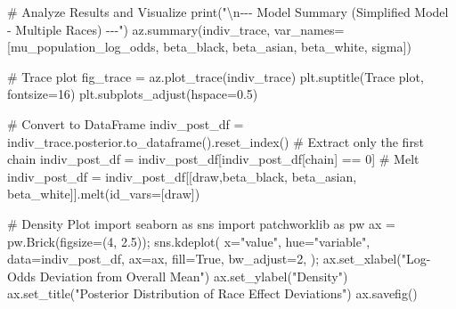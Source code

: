 \documentclass[
]{agujournal2019}
\newenvironment{Shaded}{\begin{snugshade}}{\end{snugshade}}
\newcommand{\BuiltInTok}[1]{\textcolor[rgb]{0.00,0.23,0.31}{#1}}
\newcommand{\CharTok}[1]{\textcolor[rgb]{0.13,0.47,0.30}{#1}}
\newcommand{\CommentTok}[1]{\textcolor[rgb]{0.37,0.37,0.37}{#1}}
\newcommand{\DecValTok}[1]{\textcolor[rgb]{0.68,0.00,0.00}{#1}}
\newcommand{\FloatTok}[1]{\textcolor[rgb]{0.68,0.00,0.00}{#1}}
\newcommand{\ImportTok}[1]{\textcolor[rgb]{0.00,0.46,0.62}{#1}}
\newcommand{\NormalTok}[1]{\textcolor[rgb]{0.00,0.23,0.31}{#1}}
\newcommand{\OperatorTok}[1]{\textcolor[rgb]{0.37,0.37,0.37}{#1}}
\newcommand{\StringTok}[1]{\textcolor[rgb]{0.13,0.47,0.30}{#1}}
\newcommand{\VariableTok}[1]{\textcolor[rgb]{0.07,0.07,0.07}{#1}}
\begin{document}
\begin{Shaded}
\begin{Highlighting}[]
\CommentTok{\# Analyze Results and Visualize}
\BuiltInTok{print}\NormalTok{(}\StringTok{"}\CharTok{\textbackslash{}n}\StringTok{{-}{-}{-} Model Summary (Simplified Model {-} Multiple Races) {-}{-}{-}"}\NormalTok{)}
\NormalTok{az.summary(indiv\_trace, var\_names}\OperatorTok{=}\NormalTok{[}\StringTok{\textquotesingle{}mu\_population\_log\_odds\textquotesingle{}}\NormalTok{, }\StringTok{\textquotesingle{}beta\_black\textquotesingle{}}\NormalTok{, }\StringTok{\textquotesingle{}beta\_asian\textquotesingle{}}\NormalTok{, }\StringTok{\textquotesingle{}beta\_white\textquotesingle{}}\NormalTok{, }\StringTok{\textquotesingle{}sigma\textquotesingle{}}\NormalTok{])}

\CommentTok{\# Trace plot}
\NormalTok{fig\_trace }\OperatorTok{=}\NormalTok{ az.plot\_trace(indiv\_trace)}
\NormalTok{plt.suptitle(}\StringTok{\textquotesingle{}Trace plot\textquotesingle{}}\NormalTok{, fontsize}\OperatorTok{=}\DecValTok{16}\NormalTok{)}
\NormalTok{plt.subplots\_adjust(hspace}\OperatorTok{=}\FloatTok{0.5}\NormalTok{) }

\CommentTok{\# Convert to DataFrame}
\NormalTok{indiv\_post\_df }\OperatorTok{=}\NormalTok{ indiv\_trace.posterior.to\_dataframe().reset\_index()}
\CommentTok{\# Extract only the first chain}
\NormalTok{indiv\_post\_df }\OperatorTok{=}\NormalTok{ indiv\_post\_df[indiv\_post\_df[}\StringTok{\textquotesingle{}chain\textquotesingle{}}\NormalTok{] }\OperatorTok{==} \DecValTok{0}\NormalTok{]}
\CommentTok{\# Melt}
\NormalTok{indiv\_post\_df }\OperatorTok{=}\NormalTok{ indiv\_post\_df[[}\StringTok{\textquotesingle{}draw\textquotesingle{}}\NormalTok{,}\StringTok{\textquotesingle{}beta\_black\textquotesingle{}}\NormalTok{, }\StringTok{\textquotesingle{}beta\_asian\textquotesingle{}}\NormalTok{, }\StringTok{\textquotesingle{}beta\_white\textquotesingle{}}\NormalTok{]].melt(id\_vars}\OperatorTok{=}\NormalTok{[}\StringTok{\textquotesingle{}draw\textquotesingle{}}\NormalTok{])}

\CommentTok{\# Density Plot}
\ImportTok{import}\NormalTok{ seaborn }\ImportTok{as}\NormalTok{ sns}
\ImportTok{import}\NormalTok{ patchworklib }\ImportTok{as}\NormalTok{ pw}
\NormalTok{ax }\OperatorTok{=}\NormalTok{ pw.Brick(figsize}\OperatorTok{=}\NormalTok{(}\DecValTok{4}\NormalTok{, }\FloatTok{2.5}\NormalTok{))}\OperatorTok{;}
\NormalTok{sns.kdeplot(}
\NormalTok{    x}\OperatorTok{=}\StringTok{"value"}\NormalTok{, hue}\OperatorTok{=}\StringTok{"variable"}\NormalTok{, data}\OperatorTok{=}\NormalTok{indiv\_post\_df, ax}\OperatorTok{=}\NormalTok{ax,}
\NormalTok{    fill}\OperatorTok{=}\VariableTok{True}\NormalTok{, bw\_adjust}\OperatorTok{=}\DecValTok{2}\NormalTok{,}
\NormalTok{)}\OperatorTok{;}
\NormalTok{ax.set\_xlabel(}\StringTok{"Log{-}Odds Deviation from Overall Mean"}\NormalTok{)}
\NormalTok{ax.set\_ylabel(}\StringTok{"Density"}\NormalTok{)}
\NormalTok{ax.set\_title(}\StringTok{"Posterior Distribution of Race Effect Deviations"}\NormalTok{)}
\NormalTok{ax.savefig()}
\end{Highlighting}
\end{Shaded}
\end{document}
